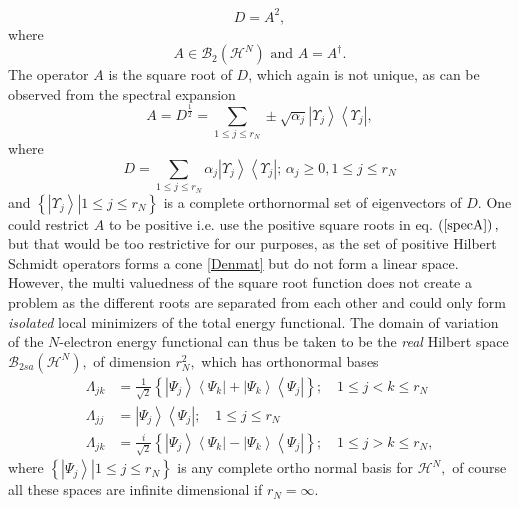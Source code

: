 \documentclass[aps,preprint]{revtex4}%
\begin{document}
\begin{equation}
D=A^{2},
\end{equation}
where
\begin{equation}
A\in\mathcal{B}_{2}\left(  \mathcal{H}^{N}\right)  \text{ and }A=A^{\dagger}.
\end{equation}
The operator $A$ is the square root of $D$, which again is not unique, as can
be observed from the spectral expansion
\begin{equation}
A=D^{\frac{1}{2}}=\sum_{1\leq j\leq r_{N}}\pm\sqrt{\alpha_{j}}\left\vert
\Upsilon_{j}\right\rangle \left\langle \Upsilon_{j}\right\vert , \label{specA}%
\end{equation}
where
\begin{equation}
D=\sum_{1\leq j\leq r_{N}}\alpha_{j}\left\vert \Upsilon_{j}\right\rangle
\left\langle \Upsilon_{j}\right\vert ;\,\alpha_{j}\geq0,1\leq j\leq r_{N}%
\end{equation}
and $\left\{  \left.  \left\vert \Upsilon_{j}\right\rangle \right\vert 1\leq
j\leq r_{N}\right\}  $ is a complete orthornormal set of eigenvectors of $D$.
One could restrict $A$ to be positive i.e. use the positive square roots in
eq. $\left(  \ref{specA}\right)  ,$ but that would be too restrictive for our
purposes, as the set of positive Hilbert Schmidt operators forms a cone
\ref{Denmat} but do not form a linear space. However, the multi valuedness of
the square root function does not create a problem as the different roots are
separated from each other and could only form \emph{isolated} local minimizers
of the total energy functional. The domain of variation of the $N$-electron
energy functional can thus be taken to be the \emph{real} Hilbert space
$\mathcal{B}_{2sa}\left(  \mathcal{H}^{N}\right)  ,$ of dimension $r_{N}^{2},$
which has orthonormal bases
\begin{align}
\Lambda_{jk}  &  =\frac{1}{\sqrt{2}}\left\{  \left\vert \Psi_{j}\right\rangle
\left\langle \Psi_{k}\right\vert +\left\vert \Psi_{k}\right\rangle
\left\langle \Psi_{j}\right\vert \right\}  ;\quad1\leq j<k\leq r_{N}%
\nonumber\\
\Lambda_{jj}  &  =\left\vert \Psi_{j}\right\rangle \left\langle \Psi
_{j}\right\vert ;\quad1\leq j\leq r_{N}\nonumber\\
\Lambda_{jk}  &  =\frac{i}{\sqrt{2}}\left\{  \left\vert \Psi_{j}\right\rangle
\left\langle \Psi_{k}\right\vert -\left\vert \Psi_{k}\right\rangle
\left\langle \Psi_{j}\right\vert \right\}  ;\quad1\leq j>k\leq r_{N},
\end{align}
where $\left\{  \left.  \left\vert \Psi_{j}\right\rangle \right\vert 1\leq
j\leq r_{N}\right\}  $ is any complete ortho normal basis for $\mathcal{H}%
^{N},$ of course all these spaces are infinite dimensional if $r_{N}=\infty.$
\end{document}
